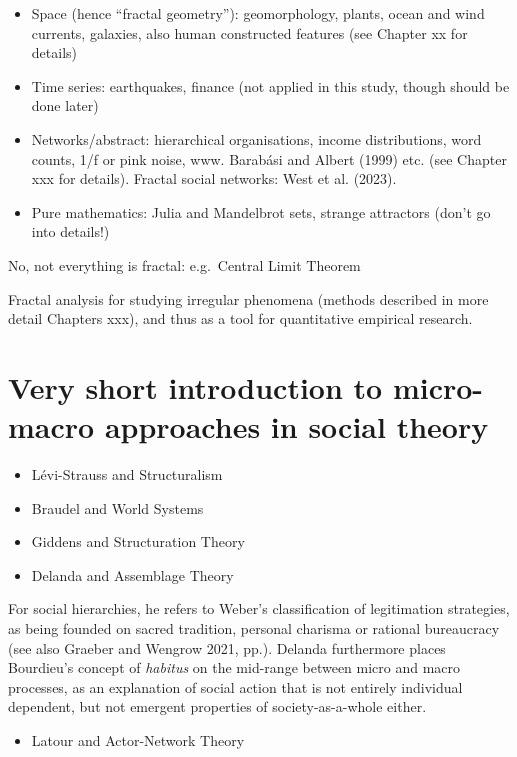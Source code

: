 \documentclass[
  12pt,
]{book}
\providecommand{\tightlist}{%
  \setlength{\itemsep}{0pt}\setlength{\parskip}{0pt}}
\begin{document}
\begin{itemize}
\item
  Space (hence ``fractal geometry''): geomorphology, plants, ocean and wind currents, galaxies, also human constructed features (see Chapter xx for details)
\item
  Time series: earthquakes, finance (not applied in this study, though should be done later)
\item
  Networks/abstract: hierarchical organisations, income distributions, word counts, 1/f or pink noise, www. Barabási and Albert (1999) etc. (see Chapter xxx for details). Fractal social networks: West et al. (2023).
\item
  Pure mathematics: Julia and Mandelbrot sets, strange attractors (don't go into details!)
\end{itemize}

No, not everything is fractal: e.g.~Central Limit Theorem

Fractal analysis for studying irregular phenomena (methods described in more detail Chapters xxx), and thus as a tool for quantitative empirical research.

\hypertarget{very-short-introduction-to-micro-macro-approaches-in-social-theory}{%
\section{Very short introduction to micro-macro approaches in social theory}\label{very-short-introduction-to-micro-macro-approaches-in-social-theory}}

\begin{itemize}
\item
  Lévi-Strauss and Structuralism
\item
  Braudel and World Systems
\item
  Giddens and Structuration Theory
\item
  Delanda and Assemblage Theory
\end{itemize}

For social hierarchies, he refers to Weber's classification of legitimation strategies, as being founded on sacred tradition, personal charisma or rational bureaucracy (see also Graeber and Wengrow 2021, pp.). Delanda furthermore places Bourdieu's concept of \emph{habitus} on the mid-range between micro and macro processes, as an explanation of social action that is not entirely individual dependent, but not emergent properties of society-as-a-whole either.

\begin{itemize}
\tightlist
\item
  Latour and Actor-Network Theory
\end{itemize}
\end{document}
